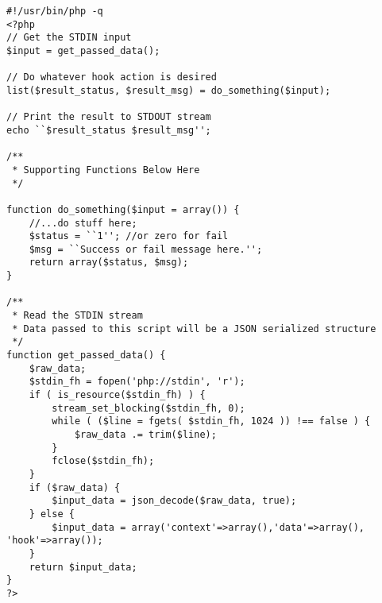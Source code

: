 \begin{verbatim}
#!/usr/bin/php -q
<?php
// Get the STDIN input
$input = get_passed_data(); 

// Do whatever hook action is desired
list($result_status, $result_msg) = do_something($input);

// Print the result to STDOUT stream
echo ``$result_status $result_msg'';

/**
 * Supporting Functions Below Here
 */

function do_something($input = array()) {
    //...do stuff here;
    $status = ``1''; //or zero for fail
    $msg = ``Success or fail message here.'';
    return array($status, $msg);
}

/**
 * Read the STDIN stream
 * Data passed to this script will be a JSON serialized structure
 */
function get_passed_data() {
    $raw_data;
    $stdin_fh = fopen('php://stdin', 'r');
    if ( is_resource($stdin_fh) ) {
        stream_set_blocking($stdin_fh, 0);
        while ( ($line = fgets( $stdin_fh, 1024 )) !== false ) {
            $raw_data .= trim($line);
        }
        fclose($stdin_fh);
    }
    if ($raw_data) {
        $input_data = json_decode($raw_data, true);
    } else {
        $input_data = array('context'=>array(),'data'=>array(), 'hook'=>array());
    }
    return $input_data;
}
?>
\end{verbatim}

